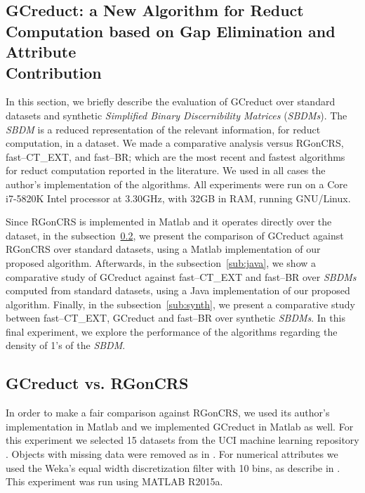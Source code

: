 \documentclass[authoryear,11pt]{elsarticle}
\begin{document}
\subsection{GCreduct: a New Algorithm for Reduct Computation based on Gap Elimination and Attribute\\ Contribution}\label{evaluation}
  In this section, we briefly describe the evaluation of GCreduct over standard datasets \citep{Bache13} and synthetic \textit{Simplified Binary Discernibility Matrices} (\textit{SBDMs}). The \textit{SBDM} is a reduced representation of the relevant information, for reduct computation, in a dataset. We made a comparative analysis versus RGonCRS, fast--CT\_EXT, and fast--BR; which are the most recent and fastest algorithms for reduct computation reported in the literature. We used in all cases the author's implementation of the algorithms. All experiments were run on a Core i7-5820K Intel processor at 3.30GHz, with 32GB in RAM, running GNU/Linux.

  Since RGonCRS is implemented in Matlab and it operates directly over the dataset, in the subsection~\ref{sub:matlab}, we present the comparison of  GCreduct against RGonCRS over standard datasets, using a Matlab implementation of our proposed algorithm. Afterwards, in the subsection~\ref{sub:java}, we show a comparative study of GCreduct against fast--CT\_EXT and fast--BR over \textit{SBDMs} computed from standard datasets, using a Java implementation of our proposed algorithm. Finally, in the subsection~\ref{sub:synth}, we present a comparative study between fast--CT\_EXT, GCreduct and fast--BR over synthetic \textit{SBDMs}. In this final experiment, we explore the performance of the algorithms regarding the density of 1's of the \textit{SBDM}.

\subsection{GCreduct vs. RGonCRS}\label{sub:matlab}
  In order to make a fair comparison against RGonCRS, we used its author's implementation in Matlab and we implemented GCreduct in Matlab as well. For this experiment we selected 15 datasets from the UCI machine learning repository \citep{Bache13}. Objects with missing data were removed as in \citep{WangP07}. For numerical attributes we used the Weka's equal width discretization filter with 10 bins, as describe in \cite{Flores2010}. This experiment was run using MATLAB R2015a.
\end{document}
